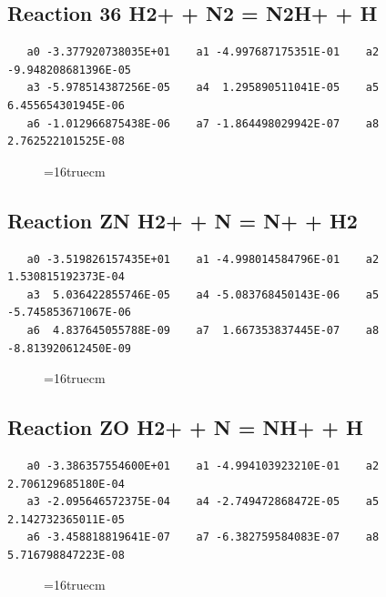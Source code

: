 \documentclass[12pt,dvipdfm]{article}
\begin{document}
\subsection{
Reaction 36 H2+ + N2 = N2H+ + H}
\begin{small}\begin{verbatim}
   a0 -3.377920738035E+01    a1 -4.997687175351E-01    a2 -9.948208681396E-05
   a3 -5.978514387256E-05    a4  1.295890511041E-05    a5  6.455654301945E-06
   a6 -1.012966875438E-06    a7 -1.864498029942E-07    a8  2.762522101525E-08
   \end{verbatim}\end{small}
\begin{figure}[h!]
\label{n2rates}
\epsfxsize=16truecm
\end{figure}
\newpage

\subsection{
Reaction ZN H2+ + N = N+ + H2}
\begin{small}\begin{verbatim}
   a0 -3.519826157435E+01    a1 -4.998014584796E-01    a2  1.530815192373E-04
   a3  5.036422855746E-05    a4 -5.083768450143E-06    a5 -5.745853671067E-06
   a6  4.837645055788E-09    a7  1.667353837445E-07    a8 -8.813920612450E-09
   \end{verbatim}\end{small}
\begin{figure}[h!]
\label{n2rates}
\epsfxsize=16truecm
\end{figure}
\newpage

\subsection{
Reaction ZO H2+ + N = NH+ + H}
\begin{small}\begin{verbatim}
   a0 -3.386357554600E+01    a1 -4.994103923210E-01    a2  2.706129685180E-04
   a3 -2.095646572375E-04    a4 -2.749472868472E-05    a5  2.142732365011E-05
   a6 -3.458818819641E-07    a7 -6.382759584083E-07    a8  5.716798847223E-08
   \end{verbatim}\end{small}
\begin{figure}[h!]
\label{n2rates}
\epsfxsize=16truecm
\end{figure}
\newpage
\end{document}
